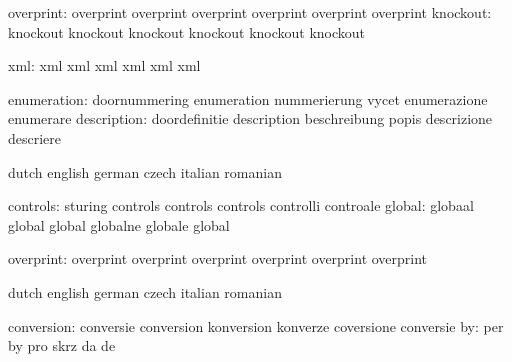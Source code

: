                 overprint: overprint                 overprint
                           overprint                 overprint
                           overprint                 overprint %
                 knockout: knockout                  knockout
                           knockout                  knockout
                           knockout                  knockout %

                      xml: xml                       xml
                           xml                       xml
                           xml                       xml

              enumeration: doornummering             enumeration
                           nummerierung              vycet
                           enumerazione              enumerare
              description: doordefinitie             description
                           beschreibung              popis
                           descrizione               descriere

\stopvariables

\startconstants            dutch                     english
                           german                    czech
                           italian                   romanian

                 controls: sturing                   controls
                           controls                  controls
                           controlli                 controale
                   global: globaal                   global
                           global                    globalne
                           globale                   global

                overprint: overprint                 overprint
                           overprint                 overprint
                           overprint                 overprint %

\stopconstants





\startvariables            dutch                     english
                           german                    czech
                           italian                   romanian

               conversion: conversie                 conversion
                           konversion                konverze
                           coversione                conversie
                       by: per                       by
                           pro                       skrz
                           da                        de

